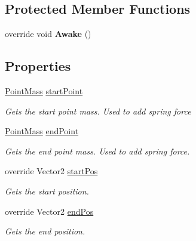 \subsection*{Protected Member Functions}
\begin{DoxyCompactItemize}
\item 
\hypertarget{class_fractal_tree_1_1_moving_branch_impl_adf817bef89fca3d8a86c9c6197cb0f95}{}\label{class_fractal_tree_1_1_moving_branch_impl_adf817bef89fca3d8a86c9c6197cb0f95} 
override void {\bfseries Awake} ()
\end{DoxyCompactItemize}
\subsection*{Properties}
\begin{DoxyCompactItemize}
\item 
\hyperlink{class_fractal_tree_1_1_point_mass}{Point\+Mass} \hyperlink{class_fractal_tree_1_1_moving_branch_impl_a360370cd5f0fb613596cb8d0fe942ffe}{start\+Point}
\begin{DoxyCompactList}\small\item\em Gets the start point mass. Used to add spring force \end{DoxyCompactList}\item 
\hyperlink{class_fractal_tree_1_1_point_mass}{Point\+Mass} \hyperlink{class_fractal_tree_1_1_moving_branch_impl_aa2f492300936b8d8ce786050a5b7f2df}{end\+Point}
\begin{DoxyCompactList}\small\item\em Gets the end point mass. Used to add spring force. \end{DoxyCompactList}\item 
override Vector2 \hyperlink{class_fractal_tree_1_1_moving_branch_impl_a520d7fca22147e6a552b4c4f2b946259}{start\+Pos}
\begin{DoxyCompactList}\small\item\em Gets the start position. \end{DoxyCompactList}\item 
override Vector2 \hyperlink{class_fractal_tree_1_1_moving_branch_impl_a76ba4f9f3d3cad097bfa39f423775423}{end\+Pos}
\begin{DoxyCompactList}\small\item\em Gets the end position. \end{DoxyCompactList}\end{DoxyCompactItemize}
